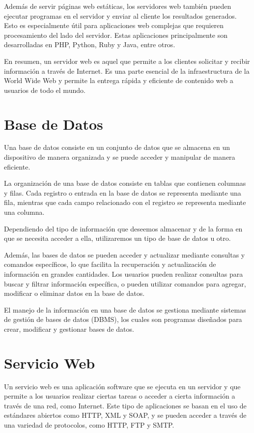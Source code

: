 Además de servir páginas web estáticas, los servidores web también pueden ejecutar programas en el servidor y enviar al cliente los resultados generados. Esto es especialmente útil para aplicaciones web complejas que requieren procesamiento del lado del servidor. 
Estas aplicaciones principalmente son desarrolladas en PHP, Python, Ruby y Java, entre otros.

En resumen, un servidor web es aquel que permite a los clientes solicitar y recibir información a través de Internet. Es una parte esencial de la infraestructura de la World Wide Web y permite la entrega rápida y eficiente de contenido web a usuarios de todo el mundo.

\section{Base de Datos}

Una base de datos \cite{wiki:BaseDeDatos} consiste en un conjunto de datos que se almacena en un dispositivo de manera organizada y se puede acceder y manipular de manera eficiente.  

La organización de una base de datos consiste en tablas que contienen columnas y filas. Cada registro o entrada en la base de datos se representa mediante una fila, mientras que cada campo relacionado con el registro se representa mediante una columna.

Dependiendo del tipo de información que deseemos almacenar y de la forma en que se necesita acceder a ella, utilizaremos un tipo de base de datos u otro.

Además, las bases de datos se pueden acceder y actualizar mediante consultas y comandos específicos, lo que facilita la recuperación y actualización de información en grandes cantidades. Los usuarios pueden realizar consultas para buscar y filtrar información específica, o pueden utilizar comandos para agregar, modificar o eliminar datos en la base de datos.

El manejo de la información en una base de datos se gestiona mediante sistemas de gestión de bases de datos (DBMS), los cuales son programas diseñados para crear, modificar y gestionar bases de datos.

\section{Servicio Web}

Un servicio web \cite{servicioWeb} es una aplicación software que se ejecuta en un servidor y que permite a los usuarios realizar ciertas tareas o acceder a cierta información a través de una red, como Internet. Este tipo de aplicaciones se basan en el uso de estándares abiertos como HTTP, XML y SOAP, y se pueden acceder a través de una variedad de protocolos, como HTTP, FTP y SMTP.

